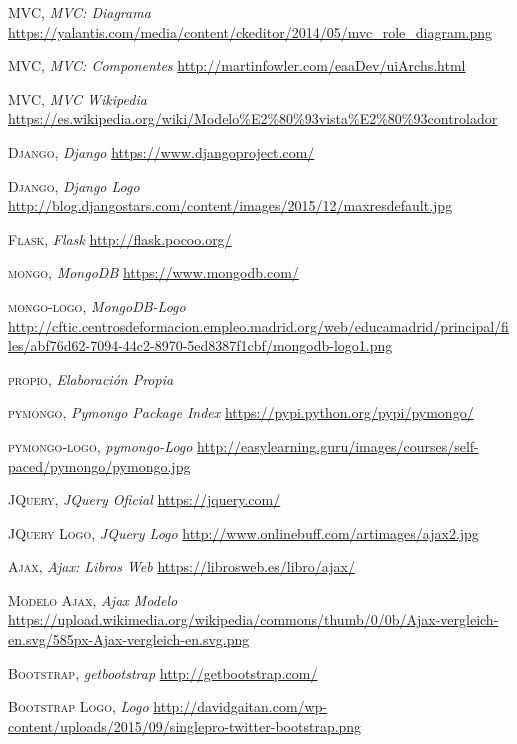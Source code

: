 \documentclass[a4paper,11pt]{book}
\begin{document}
\begin{thebibliography}{aaaa}
 \textsc{MVC},
\textit{MVC: Diagrama}
\url{https://yalantis.com/media/content/ckeditor/2014/05/mvc_role_diagram.png}

 \textsc{MVC},
\textit{MVC: Componentes}
\url{http://martinfowler.com/eaaDev/uiArchs.html}

 \textsc{MVC},
\textit{MVC Wikipedia}
\url{https://es.wikipedia.org/wiki/Modelo%E2%80%93vista%E2%80%93controlador}

 \textsc{Django},
\textit{Django}
\url{https://www.djangoproject.com/}

 \textsc{Django},
\textit{Django Logo}
\url{http://blog.djangostars.com/content/images/2015/12/maxresdefault.jpg}

 \textsc{Flask},
\textit{Flask}
\url{http://flask.pocoo.org/}

 \textsc{mongo},
\textit{MongoDB}
\url{https://www.mongodb.com/}

 \textsc{mongo-logo},
\textit{MongoDB-Logo}
\url{http://cftic.centrosdeformacion.empleo.madrid.org/web/educamadrid/principal/files/abf76d62-7094-44c2-8970-5ed8387f1cbf/mongodb-logo1.png}

 \textsc{propio},
\textit{Elaboración Propia}
\url{}

 \textsc{pymongo},
\textit{Pymongo Package Index }
\url{https://pypi.python.org/pypi/pymongo/}

 \textsc{pymongo-logo},
\textit{pymongo-Logo}
\url{http://easylearning.guru/images/courses/self-paced/pymongo/pymongo.jpg}

 \textsc{JQuery},
\textit{JQuery Oficial}
\url{https://jquery.com/}

 \textsc{JQuery Logo},
\textit{JQuery Logo}
\url{http://www.onlinebuff.com/artimages/ajax2.jpg}

 \textsc{Ajax},
\textit{Ajax: Libros Web}
\url{https://librosweb.es/libro/ajax/}

 \textsc{Modelo Ajax},
\textit{Ajax Modelo}
\url{https://upload.wikimedia.org/wikipedia/commons/thumb/0/0b/Ajax-vergleich-en.svg/585px-Ajax-vergleich-en.svg.png}



 \textsc{Bootstrap},
\textit{getbootstrap}
\url{http://getbootstrap.com/}

 \textsc{Bootstrap Logo},
\textit{Logo}
\url{http://davidgaitan.com/wp-content/uploads/2015/09/singlepro-twitter-bootstrap.png}



\end{thebibliography}
\end{document}
